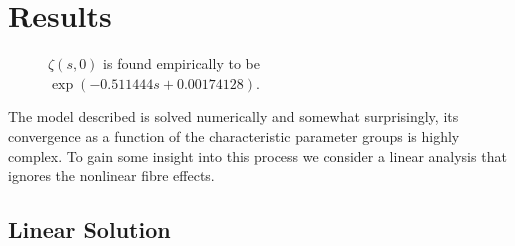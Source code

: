 \documentclass[12pt]{article}
\begin{document}
\section{Results}
\begin{wrapfigure}{r}{0.45\textwidth}
\centering
{}
\caption{$\zeta(s, 0)$ is found empirically to be $\exp(-0.511444s + 0.00174128)$.}
\label{fig:zeta}
\end{wrapfigure}
The model described is solved numerically and somewhat surprisingly, its convergence as a function of the characteristic parameter groups is highly complex. To gain some insight into this process we consider a linear analysis that ignores the nonlinear fibre effects.

\subsection{Linear Solution}


\end{document}
